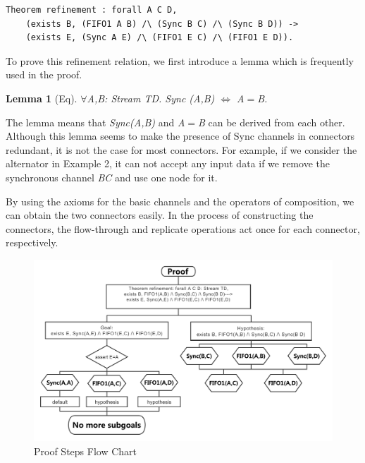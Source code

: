 \documentclass[preprint,3p]{elsarticle}
\newtheorem{lemma}{Lemma}[section]
\begin{document}
\begin{lstlisting}[language=coq]
    Theorem refinement : forall A C D,
    (exists B, (FIFO1 A B) /\ (Sync B C) /\ (Sync B D)) ->
    (exists E, (Sync A E) /\ (FIFO1 E C) /\ (FIFO1 E D)).
\end{lstlisting}



To prove this refinement relation, we first introduce a lemma which is frequently used in the proof.
\begin{lemma}[Eq]\label{lemma:eq}
$\forall$A,B: Stream TD.
  Sync (A,B) $\Leftrightarrow$ A$=$B.
\end{lemma}
The lemma means that \emph{Sync(A,B)} and \emph{A$=$B} can be derived
from each other. Although this lemma seems to make the presence of
Sync channels in connectors redundant, it is not the case for most
connectors. For example, if we consider
the alternator in Example 2, it can not accept any input data if we
remove the synchronous channel \emph{BC} and use one node for it.

By using the axioms for the basic channels and the operators of composition, we can obtain the two connectors easily.
In the process of constructing the connectors, the flow-through and replicate operations act once for each connector, respectively.


\begin{figure}[htbp]
\centering
\includegraphics[width=11.5cm]{Refinement.pdf}
\caption{Proof Steps Flow Chart}
\label{fig:equivalence}
\end{figure}
\end{document}
